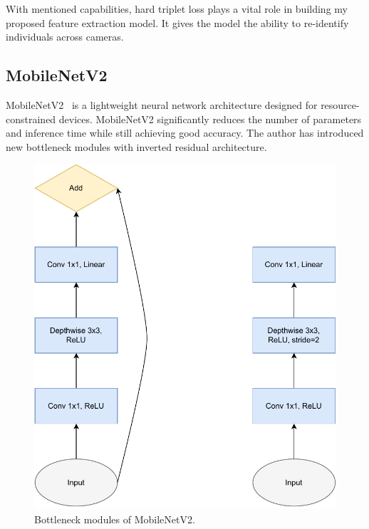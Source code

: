 \documentclass[../main.tex]{subfiles}
\begin{document}
With mentioned capabilities, hard triplet loss plays a vital role in building my proposed feature extraction model. It gives the model the ability to re-identify individuals across cameras.

\subsection{MobileNetV2}
\label{sec:mbv2}
MobileNetV2~\cite{sandler2018mobilenetv2} is a lightweight neural network architecture designed for resource-constrained devices. MobileNetV2 significantly reduces the number of parameters and inference time while still achieving good accuracy. The author has introduced new bottleneck modules with inverted residual architecture.

\begin{figure}[h!]
\centering
\includegraphics[width=0.65\linewidth]{Figure/mbv2_bottleneck.pdf}
\caption{Bottleneck modules of MobileNetV2.}
\label{fig:bottleneck}
\end{figure}
\end{document}
